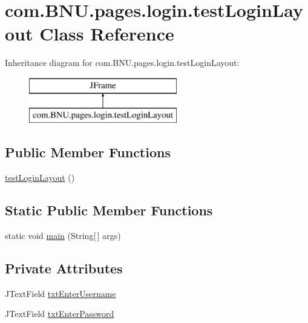 \hypertarget{classcom_1_1_b_n_u_1_1pages_1_1login_1_1test_login_layout}{}\section{com.\+B\+N\+U.\+pages.\+login.\+test\+Login\+Layout Class Reference}
\label{classcom_1_1_b_n_u_1_1pages_1_1login_1_1test_login_layout}
Inheritance diagram for com.\+B\+N\+U.\+pages.\+login.\+test\+Login\+Layout\+:\begin{figure}[H]
\begin{center}
\leavevmode
\includegraphics[height=2.000000cm]{classcom_1_1_b_n_u_1_1pages_1_1login_1_1test_login_layout}
\end{center}
\end{figure}
\subsection*{Public Member Functions}
\begin{DoxyCompactItemize}
\item 
\mbox{\hyperlink{classcom_1_1_b_n_u_1_1pages_1_1login_1_1test_login_layout_a0857c77ed34189cdd8aa42bbc1f4e19e}{test\+Login\+Layout}} ()
\end{DoxyCompactItemize}
\subsection*{Static Public Member Functions}
\begin{DoxyCompactItemize}
\item 
static void \mbox{\hyperlink{classcom_1_1_b_n_u_1_1pages_1_1login_1_1test_login_layout_a60eda506de636ffd6776e599c50e3d6d}{main}} (String\mbox{[}$\,$\mbox{]} args)
\end{DoxyCompactItemize}
\subsection*{Private Attributes}
\begin{DoxyCompactItemize}
\item 
J\+Text\+Field \mbox{\hyperlink{classcom_1_1_b_n_u_1_1pages_1_1login_1_1test_login_layout_a626671ef38de0a6bc06735a65d0980c4}{txt\+Enter\+Username}}
\item 
J\+Text\+Field \mbox{\hyperlink{classcom_1_1_b_n_u_1_1pages_1_1login_1_1test_login_layout_a10d82067e6fabcc1af317f4d10eca82c}{txt\+Enter\+Password}}
\end{DoxyCompactItemize}


